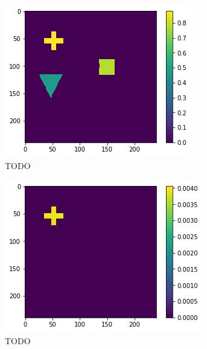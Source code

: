 \begin{figure}[H]
    \centering
    \begin{subfigure}[t]{.33\textwidth}
        \centering
        \includegraphics[width=\linewidth]{chapters/06_hdm/images_analyze/1a_masked.png}
        \caption{TODO}
    \end{subfigure}%
    \begin{subfigure}[t]{.33\textwidth}
        \centering
        \includegraphics[width=\linewidth]{chapters/06_hdm/images_analyze/1b_segment.png}
        \caption{TODO}
    \end{subfigure}
    \begin{subfigure}[t]{.33\textwidth}

\end{subfigure}
\end{figure}
